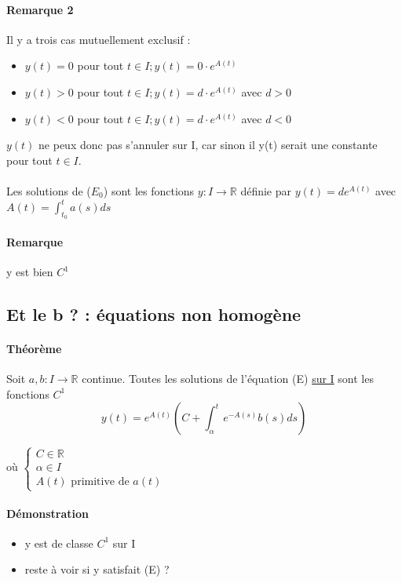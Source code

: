 \paragraph{Remarque 2} Il y a trois cas mutuellement exclusif :
\begin{itemize}
	\item $y(t) = 0$ pour tout $t \in I; y(t) = 0\cdot e^{A(t)}$
	\item $y(t) > 0$ pour tout $t \in I; y(t) = d \cdot e^{A(t)}$ avec $d>0$
	\item $y(t) < 0$ pour tout $t \in I; y(t) = d \cdot e^{A(t)}$ avec $d<0$
\end{itemize}

$y(t)$ ne peux donc pas s'annuler sur I, car sinon il y(t) serait une constante pour tout $t \in I$.

\paragraph{} Les solutions de ($E_0$) sont les fonctions $y : I \rightarrow \mathbb{R}$ définie par $y(t) = de^{A(t)}$ avec $A(t) = \int_{t_0}^t a(s)ds$
\paragraph{Remarque} y est bien $C^1$

\subsection{Et le b ? : équations non homogène}

\paragraph{Théorème} Soit $a, b : I \rightarrow \mathbb{R}$ continue. Toutes les solutions de l'équation (E) \ul{sur I} sont les fonctions $C^1$ \[y(t) = e^{A(t)} (C + \int_\alpha^t e^{-A(s)} b(s)ds)\]

où $\left\{\begin{array}{rcl}
	C \in \mathbb{R} \\
	\alpha \in I \\
	A(t) \text{ primitive de } a(t)\end{array}\right.$

	\paragraph{Démonstration} \begin{itemize}
		\item y est de classe $C^1$ sur I
\item reste à voir si y satisfait (E) ?\end{itemize}

